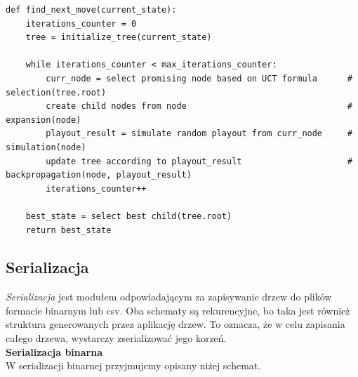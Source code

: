 \documentclass{article}
\newcommand{\modulename}[1]{\textit{#1}}
\begin{document}
\begin{lstlisting}[caption=Pseudokod algorytmu Monte Carlo Tree Search, label=lst:mcts]
def find_next_move(current_state):
	iterations_counter = 0
	tree = initialize_tree(current_state)
	
	while iterations_counter < max_iterations_counter:
		curr_node = select promising node based on UCT formula      # selection(tree.root) 
		create child nodes from node                                # expansion(node)
		playout_result = simulate random playout from curr_node     # simulation(node)
		update tree according to playout_result                     # backpropagation(node, playout_result)
		iterations_counter++
		
	best_state = select best child(tree.root) 
	return best_state
\end{lstlisting}

	
	\clearpage
	
	\subsection{Serializacja}
	\modulename{Serializacja} jest modułem odpowiadającym za zapisywanie drzew do plików formacie binarnym lub csv. Oba schematy są rekurencyjne, bo taka jest również struktura generowanych przez aplikację drzew. To oznacza, że w celu zapisania całego drzewa, wystarczy zserializować jego korzeń.\\
	
	\noindent \textbf{\large Serializacja binarna} \\
	W serializacji binarnej przyjmujemy opisany niżej schemat.\\
\end{document}
